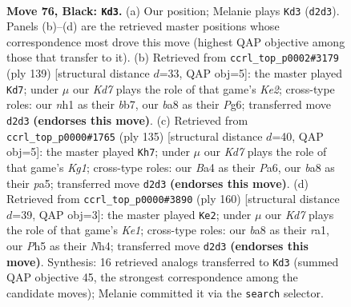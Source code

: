 \documentclass[11pt]{article}
\begin{document}
\clearpage

\begin{figure}[p]\centering
\begin{subfigure}{0.46\textwidth}\centering
\resizebox{\linewidth}{!}{%
\newchessgame
\chessboard[
  setfen={B7/2r2p2/n5p1/4P2p/b4Pp1/8/3k1K1P/7N b - - 11 76},
  showmover=false,
  pgfstyle=straightmove, color=movearrow, markmove={d2-d3}
]}
\caption{}
\end{subfigure}\hfill
\begin{subfigure}{0.46\textwidth}\centering
\resizebox{\linewidth}{!}{%
\newchessgame
\chessboard[
  setfen={8/1B2kp1p/p5pP/1n1K2P1/1P6/4B3/7b/8 b - - 12 70},
  showmover=false,
  pgfstyle=straightmove, color=movearrow, markmove={e7-d7}
]}
\caption{}
\end{subfigure}
\\[4pt]
\begin{subfigure}{0.46\textwidth}\centering
\resizebox{\linewidth}{!}{%
\newchessgame
\chessboard[
  setfen={6k1/5p2/p3p1p1/PbB1P1Pp/7P/K7/8/8 b - - 6 68},
  showmover=false,
  pgfstyle=straightmove, color=movearrow, markmove={g8-h7}
]}
\caption{}
\end{subfigure}\hfill
\begin{subfigure}{0.46\textwidth}\centering
\resizebox{\linewidth}{!}{%
\newchessgame
\chessboard[
  setfen={1R6/8/4pk2/3p4/3PnP1N/7P/6P1/r3K3 w - - 16 81},
  showmover=false,
  pgfstyle=straightmove, color=movearrow, markmove={e1-e2}
]}
\caption{}
\end{subfigure}
\caption{\textbf{Move 76, Black: \texttt{Kd3}.} (a) Our position; Melanie plays \texttt{Kd3} (\texttt{d2d3}). Panels (b)--(d) are the retrieved master positions whose correspondence most drove this move (highest QAP objective among those that transfer to it). (b) Retrieved from \texttt{ccrl\_top\_p0002\#3179} (ply 139) [structural distance $d$=33, QAP obj=5]: the master played \texttt{Kd7}; under $\mu$ our \emph{Kd7} plays the role of that game's \emph{Ke2}; cross-type roles: our \emph{n}h1 as their \emph{b}b7, our \emph{b}a8 as their \emph{P}g6; transferred move \texttt{d2d3} \textbf{(endorses this move)}. (c) Retrieved from \texttt{ccrl\_top\_p0000\#1765} (ply 135) [structural distance $d$=40, QAP obj=5]: the master played \texttt{Kh7}; under $\mu$ our \emph{Kd7} plays the role of that game's \emph{Kg1}; cross-type roles: our \emph{B}a4 as their \emph{P}a6, our \emph{b}a8 as their \emph{p}a5; transferred move \texttt{d2d3} \textbf{(endorses this move)}. (d) Retrieved from \texttt{ccrl\_top\_p0000\#3890} (ply 160) [structural distance $d$=39, QAP obj=3]: the master played \texttt{Ke2}; under $\mu$ our \emph{Kd7} plays the role of that game's \emph{Ke1}; cross-type roles: our \emph{b}a8 as their \emph{r}a1, our \emph{P}h5 as their \emph{N}h4; transferred move \texttt{d2d3} \textbf{(endorses this move)}. Synthesis: 16 retrieved analogs transferred to \texttt{Kd3} (summed QAP objective 45, the strongest correspondence among the candidate moves); Melanie committed it via the \texttt{search} selector.}
\label{fig:thought-m151}
\end{figure}
\end{document}
